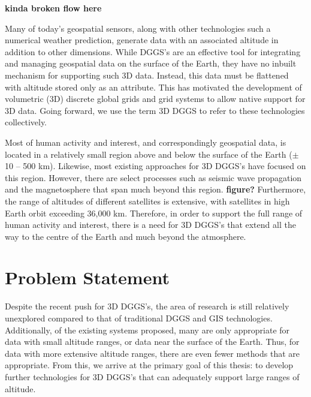 \textbf{kinda broken flow here}

Many of today's geospatial sensors, along with other technologies such a numerical weather prediction, generate data with an associated altitude in addition to other dimensions.
While DGGS's are an effective tool for integrating and managing geospatial data on the surface of the Earth, they have no inbuilt mechanism for supporting such 3D data.
Instead, this data must be flattened with altitude stored only as an attribute.
This has motivated the development of volumetric (3D) discrete global grids and grid systems to allow native support for 3D data.
Going forward, we use the term 3D DGGS to refer to these technologies collectively.


Most of human activity and interest, and correspondingly geospatial data, is located in a relatively small region above and below the surface of the Earth ($\pm$10 -- 500 km).
Likewise, most existing approaches for 3D DGGS's have focused on this region.
However, there are select processes such as seismic wave propagation and the magnetosphere that span much beyond this region. \textbf{figure?}
Furthermore, the range of altitudes of different satellites is extensive, with satellites in high Earth orbit exceeding 36,000 km.
Therefore, in order to support the full range of human activity and interest, there is a need for 3D DGGS's that extend all the way to the centre of the Earth and much beyond the atmosphere.


\section{Problem Statement}
Despite the recent push for 3D DGGS's, the area of research is still relatively unexplored compared to that of traditional DGGS and GIS technologies.
Additionally, of the existing systems proposed, many are only appropriate for data with small altitude ranges, or data near the surface of the Earth.
Thus, for data with more extensive altitude ranges, there are even fewer methods that are appropriate. 
From this, we arrive at the primary goal of this thesis: to develop further technologies for 3D DGGS's that can adequately support large ranges of altitude. 

